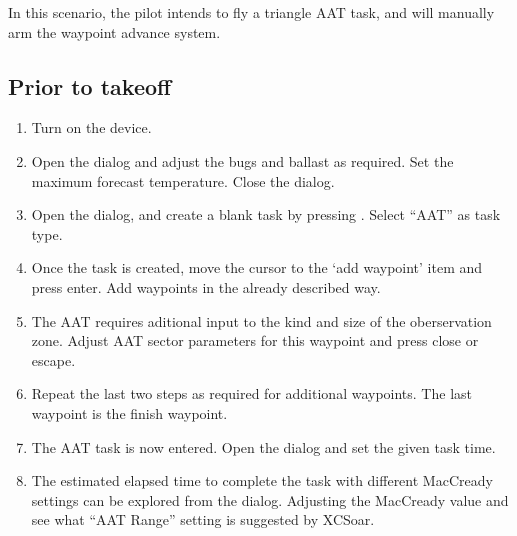 \documentclass[a4paper,12pt]{refrep}
\begin{document}
In this scenario, the pilot intends to fly a triangle AAT task, and
will manually arm the waypoint advance system.

\subsection*{Prior to takeoff}
\begin{enumerate}
\item  Turn on the device.
\item  Open the  dialog and adjust the bugs and ballast as
required. Set the maximum forecast temperature.  Close the dialog.
\item Open the  dialog, and create a blank task by pressing
. Select ``AAT'' as task type.
\item  Once the task is created, move the cursor to the `add waypoint' item
and press enter.  Add waypoints in the already described way. 
\item  The AAT requires aditional input to the kind and size of the
oberservation zone. Adjust AAT sector parameters for this waypoint and press close or escape.
\item  Repeat the last two steps as required for additional waypoints.  The last
waypoint is the finish waypoint.
\item  The AAT task is now entered.  Open the  dialog
and set the given task time. 
\item  The estimated elapsed time to complete the task with different MacCready
settings can be explored from the  dialog.  Adjusting the MacCready value and see what
``AAT Range'' setting is suggested by XCSoar.
\end{enumerate}
\end{document}
